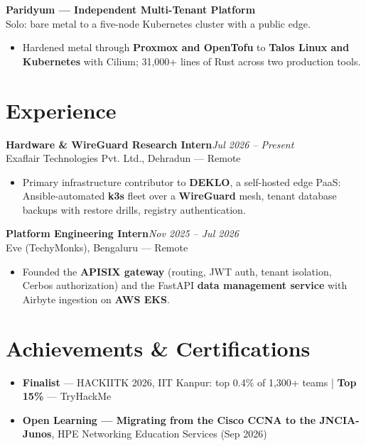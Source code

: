 \documentclass[10pt,a4paper]{article}
\newcommand{\entry}[3]{%
  \textbf{#1}\hfill\textit{\small #2}\\[-0.15em]
  {\small #3}\par\vspace{0.08em}%
}
\begin{document}
\entry{Paridyum --- Independent Multi-Tenant Platform}{}{Solo: bare metal to a five-node Kubernetes cluster with a public edge.}
\begin{itemize}
  \item Hardened metal through \textbf{Proxmox and OpenTofu} to \textbf{Talos Linux and Kubernetes} with Cilium; 31,000+ lines of Rust across two production tools.
\end{itemize}

\section{Experience}
\entry{Hardware \& WireGuard Research Intern}{Jul 2026 -- Present}{Exaflair Technologies Pvt. Ltd., Dehradun --- Remote}
\begin{itemize}
  \item Primary infrastructure contributor to \textbf{DEKLO}, a self-hosted edge PaaS: Ansible-automated \textbf{k3s} fleet over a \textbf{WireGuard} mesh, tenant database backups with restore drills, registry authentication.
\end{itemize}
\entry{Platform Engineering Intern}{Nov 2025 -- Jul 2026}{Eve (TechyMonks), Bengaluru --- Remote}
\begin{itemize}
  \item Founded the \textbf{APISIX gateway} (routing, JWT auth, tenant isolation, Cerbos authorization) and the FastAPI \textbf{data management service} with Airbyte ingestion on \textbf{AWS EKS}.
\end{itemize}

\section{Achievements \& Certifications}
\begin{itemize}
  \item \textbf{Finalist} --- HACKIITK 2026, IIT Kanpur: top 0.4\% of 1,300+ teams \;|\; \textbf{Top 15\%} --- TryHackMe
  \item \textbf{Open Learning --- Migrating from the Cisco CCNA to the JNCIA-Junos}, HPE Networking Education Services (Sep 2026)
\end{itemize}
\end{document}
